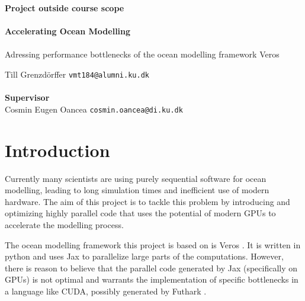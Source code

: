 \documentclass[a4paper,oneside]{memoir}
\begin{document}
    \thispagestyle{empty}
    \begin{adjustwidth}{-3cm}{-1.5cm}
    \vspace*{-1cm}
    \textbf{\Huge Project outside course scope} \\
    \vspace*{2.5cm} \\
    \textbf{\Huge Accelerating Ocean Modelling} \\
    \vspace*{.1cm} \\
    {\huge Adressing performance bottlenecks of the ocean modelling framework Veros} \\
    \begin{tabbing}
    Till Grenzdörffer \hspace{1cm} \= \texttt{vmt184@alumni.ku.dk} \\
    \\[12cm]
    \textbf{\Large Supervisor} \\
    Cosmin Eugen Oancea \> \texttt{cosmin.oancea@di.ku.dk} \\
    \end{tabbing}
    \end{adjustwidth}
    \newpage
    \ClearWallPaper



\section{Introduction}
Currently many scientists are using purely sequential software for ocean modelling, leading to long simulation times and inefficient use of modern hardware. 
The aim of this project is to tackle this problem by introducing and optimizing highly parallel code that uses the potential of modern GPUs to accelerate the modelling process.

The ocean modelling framework this project is based on is Veros \cite{veros}. It is written in python and uses Jax \cite{jax2018github} to parallelize large parts of the computations.
However, there is reason to believe that the parallel code generated by Jax (specifically on GPUs) is not optimal and warrants the implementation of specific bottlenecks in a language like CUDA, possibly generated by Futhark \cite{futhark}.
\end{document}
